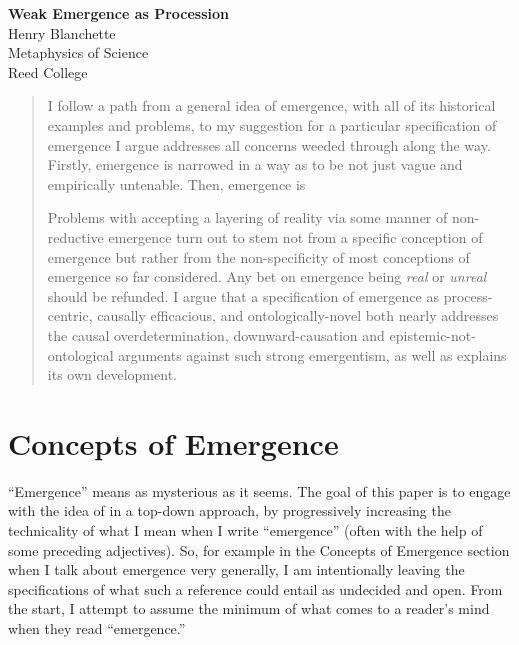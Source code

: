 \documentclass{article}
\newcommand{\ti}[1]{\textit{#1}}
\begin{document}

\begin{center}
	\huge{\bf Weak Emergence as Procession} %
    \\[0.75cm] 
	\large{Henry Blanchette} %
    \\[0.5cm]
	\large{Metaphysics of Science \\ Reed College} %
    \\[1.0cm]
\end{center}

\begin{abstract}
    I follow a path from a general idea of emergence, with all of its historical examples and problems, to my suggestion for a particular specification of emergence I argue addresses all concerns weeded through along the way. Firstly, emergence is narrowed in a way as to be not just vague and empirically untenable. Then, emergence is 

	Problems with accepting a layering of reality via some manner of non-reductive emergence turn out to stem not from a specific conception of emergence but rather from the non-specificity of most conceptions of emergence so far considered. Any bet on emergence being \ti{real} or \ti{unreal} should be refunded. I argue that a specification of emergence as process-centric, causally efficacious, and ontologically-novel both nearly addresses the causal overdetermination, downward-causation and epistemic-not-ontological arguments against such strong emergentism, as well as explains its own development.
\end{abstract}

\section{Concepts of Emergence}

``Emergence'' means as mysterious as it seems. The goal of this paper is to engage with the idea of in a top-down approach, by progressively increasing the technicality of what I mean when I write ``emergence'' (often with the help of some preceding adjectives). So, for example in the Concepts of Emergence section when I talk about emergence very generally, I am intentionally leaving the specifications of what such a reference could entail as undecided and open. From the start, I attempt to assume the minimum of what comes to a reader's mind when they read ``emergence.''
\end{document}
